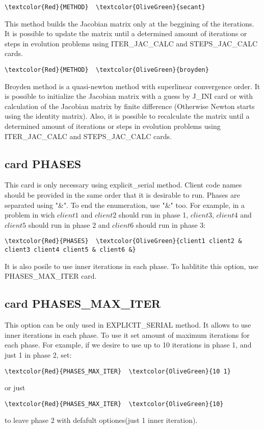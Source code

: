 \begin{Verbatim}[frame=single,commandchars=\\\{\}]
\textcolor{Red}{METHOD}  \textcolor{OliveGreen}{secant} 
\end{Verbatim}
This method builds the Jacobian matrix only at the beggining of the iterations. It is possible to update the matrix until a determined amount of iterations or steps in evolution problems using ITER_JAC_CALC and STEPS_JAC_CALC cards.

\begin{Verbatim}[frame=single,commandchars=\\\{\}]
\textcolor{Red}{METHOD}  \textcolor{OliveGreen}{broyden}
\end{Verbatim}
Broyden method is a quasi-newton method with superlinear convergence order. It is possible to initialize the Jacobian matrix with a guess by J_INI card or with calculation of the Jacobian matrix by finite difference (Otherwise Newton starts using the identity matrix). Also, it is possible to recalculate the matrix until a determined amount of iterations or steps in evolution problems using ITER_JAC_CALC and STEPS_JAC_CALC cards.

\subsection{card PHASES}
This card is only necessary using explicit_serial method. Client code names should be provided in the same order that it is desirable to run. Phases are separated using "\&". To end the enumeration, use "\&" too. For example, in a problem in wich $client1$ and $client2$ should run in phase 1, $client3$, $client4$ and $client5$ should run in phase 2 and $client6$ should run in phase 3:
\begin{Verbatim}[frame=single,commandchars=\\\{\}]
\textcolor{Red}{PHASES}  \textcolor{OliveGreen}{client1 client2 & client3 client4 client5 & client6 &}
\end{Verbatim}
It is also posile to use inner iterations in each phase. To hablitite this option, use PHASES_MAX_ITER card.

\subsection{card PHASES_MAX_ITER}
This option can be only used in EXPLICIT_SERIAL method. It allows to use inner iterations in each phase. To use it set amount of maximum iterations for each phase. For example, if we desire to use up to 10 iterations in phase 1, and just 1 in phase 2, set:
\begin{Verbatim}[frame=single,commandchars=\\\{\}]
\textcolor{Red}{PHASES_MAX_ITER}  \textcolor{OliveGreen}{10 1}
\end{Verbatim}
or just
\begin{Verbatim}[frame=single,commandchars=\\\{\}]
\textcolor{Red}{PHASES_MAX_ITER}  \textcolor{OliveGreen}{10}
\end{Verbatim}
to leave phase 2 with defafult optiones(just 1 inner iteration).

